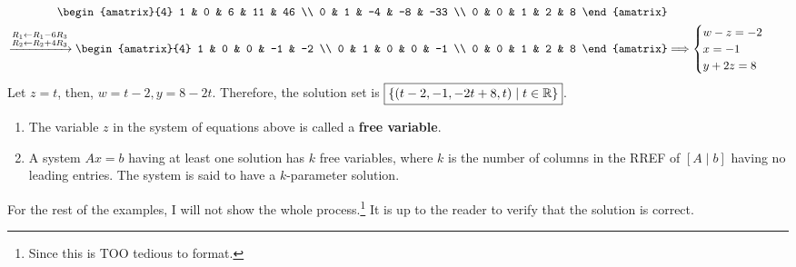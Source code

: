 \begin{align*}
\begin{amatrix}{4}
    1 & 0 & 6 & 11 & 46 \\
    0 & 1 & -4 & -8 & -33 \\
    0 & 0 & 1 & 2 & 8
\end{amatrix} \\
\xrightarrow{\substack{R_1 \leftarrow R_1 - 6R_3 \\ R_2 \leftarrow R_2 + 4R_3}}
\begin{amatrix}{4}
    1 & 0 & 0 & -1 & -2 \\
    0 & 1 & 0 & 0 & -1 \\
    0 & 0 & 1 & 2 & 8
\end{amatrix} & \Longrightarrow 
\begin{cases}
    w - z = -2 \\
    x = -1 \\
    y + 2z = 8
\end{cases}
\end{align*}
Let $z = t$, then, $w = t - 2, y = 8-2t$. Therefore, the solution set is $\boxed{\{(t - 2, -1, -2t + 8, t) \mid t \in \mathbb{R}\}}$.

\begin{remark}
\leavevmode
\begin{enumerate}
    \item The variable $z$ in the system of equations above is called a \textbf{free variable}.
    \item A system $Ax = b$ having at least one solution has $k$ free variables, where $k$ is the number of columns in the RREF of $[A \mid b]$ having no leading entries. The system is said to have a $k$-parameter solution.
\end{enumerate}
\end{remark}

For the rest of the examples, I will not show the whole process.\footnote{Since this is TOO tedious to format.} It is up to the reader to verify that the solution is correct.

